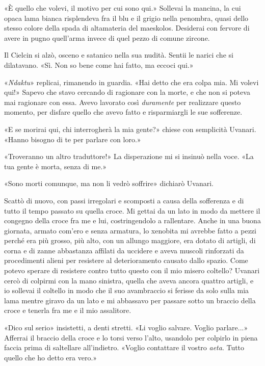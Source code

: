 «È quello che volevi, il motivo per cui sono qui.» Sollevai la mancina,
la cui opaca lama bianca risplendeva fra il blu e il grigio nella
penombra, quasi dello stesso colore della spada di altamateria del
maeskolos. Desiderai con fervore di avere in pugno quell'arma invece di
quel pezzo di comune zircone.

Il Cielcin si alzò, osceno e satanico nella sua nudità. Sentii le narici
che si dilatavano. «Sì. Non so bene come hai fatto, ma eccoci qui.»

«\emph{Ndaktu}» replicai, rimanendo in guardia. «Hai detto che era colpa
mia. Mi volevi qui!» Sapevo che stavo cercando di ragionare con la
morte, e che non si poteva mai ragionare con essa. Avevo lavorato così
\emph{duramente} per realizzare questo momento, per disfare quello che
avevo fatto e risparmiargli le sue sofferenze.

«E se morirai qui, chi interrogherà la mia gente?» chiese con semplicità
Uvanari. «Hanno bisogno di te per parlare con loro.»

«Troveranno un altro traduttore!» La disperazione mi si insinuò nella
voce. «La tua gente è morta, senza di me.»

«Sono morti comunque, ma non li vedrò soffrire» dichiarò Uvanari.

Scattò di nuovo, con passi irregolari e scomposti a causa della
sofferenza e di tutto il tempo passato su quella croce. Mi gettai da un
lato in modo da mettere il congegno della croce fra me e lui,
costringendolo a rallentare. Anche in una buona giornata, armato com'ero
e senza armatura, lo xenobita mi avrebbe fatto a pezzi perché era più
grosso, più alto, con un allungo maggiore, era dotato di artigli, di
corna e di zanne abbastanza affilati da uccidere e aveva muscoli
rinforzati da procedimenti alieni per resistere al deterioramento
causato dallo spazio. Come potevo sperare di resistere contro tutto
questo con il mio misero coltello? Uvanari cercò di colpirmi con la mano
sinistra, quella che aveva ancora quattro artigli, e io sollevai il
coltello in modo che il suo avambraccio si ferisse da solo sulla mia
lama mentre giravo da un lato e mi abbassavo per passare sotto un
braccio della croce e tenerla fra me e il mio assalitore.

«Dico sul serio» insistetti, a denti stretti. «Li voglio salvare. Voglio
parlare...» Afferrai il braccio della croce e lo torsi verso l'alto,
usandolo per colpirlo in piena faccia prima di saltellare all'indietro.
«Voglio contattare il vostro \emph{aeta}. Tutto quello che ho detto era
vero.»

